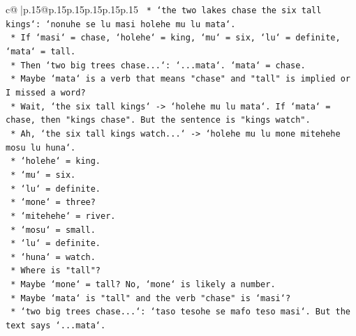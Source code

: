\documentclass{article}
\begin{document}
{\begin{supertabular}{c@{$\;$}|p{.15\linewidth}@{}p{.15\linewidth}p{.15\linewidth}p{.15\linewidth}p{.15\linewidth}p{.15\linewidth}}
{{{\texttt{                                            *   `the two lakes chase the six tall kings`: `nonuhe se lu masi holehe mu lu mata`.} \\
\texttt{                                            *   If `masi` = chase, `holehe` = king, `mu` = six, `lu` = definite, `mata` = tall.} \\
\texttt{                                            *   Then `two big trees chase...`: `...mata`. `mata` = chase.} \\
\texttt{                                            *   Maybe `mata` is a verb that means "chase" and "tall" is implied or I missed a word?} \\
\texttt{                                            *   Wait, `the six tall kings` {-}> `holehe mu lu mata`. If `mata` = chase, then "kings chase". But the sentence is "kings watch".} \\
\texttt{                                            *   Ah, `the six tall kings watch...` {-}> `holehe mu lu mone mitehehe mosu lu huna`.} \\
\texttt{                                                *   `holehe` = king.} \\
\texttt{                                                *   `mu` = six.} \\
\texttt{                                                *   `lu` = definite.} \\
\texttt{                                                *   `mone` = three?} \\
\texttt{                                                *   `mitehehe` = river.} \\
\texttt{                                                *   `mosu` = small.} \\
\texttt{                                                *   `lu` = definite.} \\
\texttt{                                                *   `huna` = watch.} \\
\texttt{                                                *   Where is "tall"?} \\
\texttt{                                                *   Maybe `mone` = tall? No, `mone` is likely a number.} \\
\texttt{                                                *   Maybe `mata` is "tall" and the verb "chase" is `masi`?} \\
\texttt{                                                    *   `two big trees chase...`: `taso tesohe se mafo teso masi`. But the text says `...mata`.} \\
}}}
\end{supertabular}}
\end{document}
